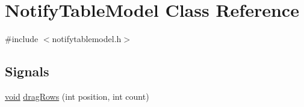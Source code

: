 \hypertarget{class_notify_table_model}{\section{\-Notify\-Table\-Model \-Class \-Reference}
\label{class_notify_table_model}
}


{\ttfamily \#include $<$notifytablemodel.\-h$>$}

\subsection*{\-Signals}
\begin{DoxyCompactItemize}
\item 
\hyperlink{group___u_a_v_objects_plugin_ga444cf2ff3f0ecbe028adce838d373f5c}{void} \hyperlink{group___notify_plugin_ga87b02089128dd9f2eddbd2e70040201f}{drag\-Rows} (int position, int count)
\end{DoxyCompactItemize}
